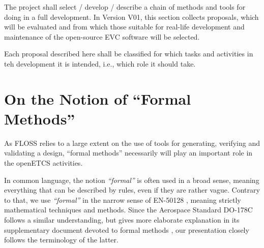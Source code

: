 
The project shall select / develop / describe a chain of methods and
tools for doing \vv in a full development. In Version V01, this
section collects proposals, which will be evaluated and from which
those suitable for real-life
development and maintenance of the open-source EVC software will be selected.

Each proposal described here shall be classified for which tasks and
activities in teh development it is intended, i.e., which role it
should take.


\chapter{On the Notion of ``Formal Methods''}
\label{sec:notion-formal-method}

As FLOSS relies to a large extent on the use of tools for generating, 
verifying and validating a design, ``formal methods'' necessarily will
play an important role in the openETCS activities.  

In common language, the notion {\em ``formal''} is often used in a
broad sense, meaning everything that can be described by rules, even
if they are rather vague.
%
Contrary to that, we use {\em ``formal''} in the narrow sense of
EN-50128 \cite[Section~D.28]{en50128},
meaning strictly mathematical techniques and methods.
%
Since the Aerospace Standard DO-178C \cite{DO-178C}
follows a similar understanding,
but gives more elaborate explanation in its supplementary document
devoted to formal methods \cite{DO-333},
our presentation closely follows the terminology of the latter.


